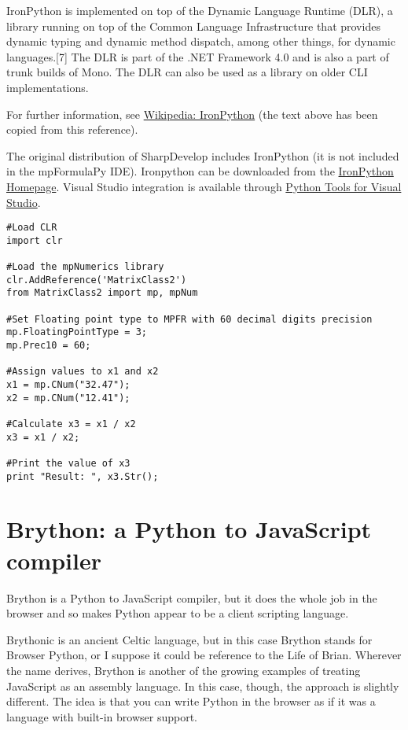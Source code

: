 IronPython is implemented on top of the Dynamic Language Runtime (DLR), a library running on top of the Common Language Infrastructure that provides dynamic typing and dynamic method dispatch, among other things, for dynamic languages.[7] The DLR is part of the .NET Framework 4.0 and is also a part of trunk builds of Mono. The DLR can also be used as a library on older CLI implementations.

For further information, see \href{http://en.wikipedia.org/wiki/IronPython}{Wikipedia: IronPython} (the text above has been copied from this reference).

The original distribution of SharpDevelop includes IronPython (it is not included in the mpFormulaPy IDE). Ironpython can be downloaded from the 
\href{http://ironpython.net/}{IronPython Homepage}. Visual Studio integration is available through  \href{http://ironpython.net/tools/}{Python Tools for Visual Studio}.


\begin{lstlisting}
#Load CLR
import clr

#Load the mpNumerics library
clr.AddReference('MatrixClass2')
from MatrixClass2 import mp, mpNum

#Set Floating point type to MPFR with 60 decimal digits precision
mp.FloatingPointType = 3;
mp.Prec10 = 60;

#Assign values to x1 and x2
x1 = mp.CNum("32.47");
x2 = mp.CNum("12.41");

#Calculate x3 = x1 / x2
x3 = x1 / x2;

#Print the value of x3
print "Result: ", x3.Str();
\end{lstlisting}





\newpage
\section{Brython: a Python to JavaScript compiler}

Brython is a Python to JavaScript compiler, but it does the whole job in the browser and so makes Python appear to be a client scripting language. 

Brythonic is an ancient Celtic language, but in this case Brython stands for Browser Python, or I suppose it could be reference to the Life of Brian. Wherever the name derives, Brython is another of the growing examples of treating JavaScript as an assembly language. In this case, though, the approach is slightly different. The idea is that you can write Python in the browser as if it was a language with built-in browser support. 

